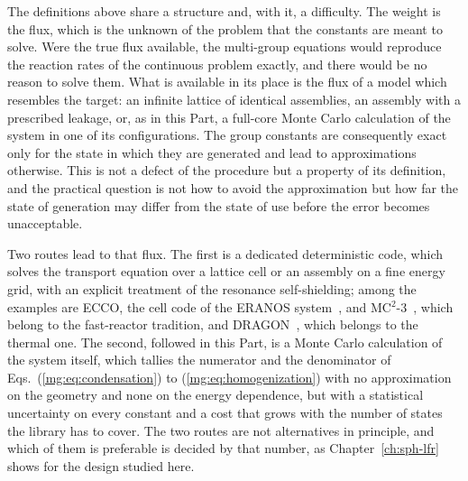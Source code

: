 The definitions above share a structure and, with it, a difficulty. The weight is
the flux, which is the unknown of the problem that the constants are meant to
solve. Were the true flux available, the multi-group equations would reproduce
the reaction rates of the continuous problem exactly, and there would be no
reason to solve them. What is available in its place is the flux of a model
which resembles the target: an infinite lattice of identical assemblies, an
assembly with a prescribed leakage, or, as in this Part, a full-core Monte Carlo
calculation of the system in one of its configurations. The group constants are
consequently exact only for the state in which they are generated and lead to
approximations otherwise. This is not a defect of the procedure but a property
of its definition, and the practical question is not how to avoid the
approximation but how far the state of generation may differ from the state of
use before the error becomes unacceptable.

Two routes lead to that flux. The first is a dedicated deterministic code, which
solves the transport equation over a lattice cell or an assembly on a fine energy
grid, with an explicit treatment of the resonance self-shielding; among the
examples are ECCO, the cell code of the ERANOS system~\cite{eranos}, and
MC$^2$-3~\cite{mc23}, which belong to the fast-reactor tradition, and
DRAGON~\cite{dragon}, which belongs to the thermal one. The second,
followed in this Part, is a Monte Carlo calculation of the system itself,
which tallies the numerator and the denominator of
Eqs.~(\ref{mg:eq:condensation}) to (\ref{mg:eq:homogenization}) with no
approximation on the geometry and none on the energy dependence, but with
a statistical uncertainty on every constant and a cost that grows with the
number of states the library has to cover. The two routes are not alternatives in
principle, and which of them is preferable is decided by that number, as
Chapter~\ref{ch:sph-lfr} shows for the design studied here.


